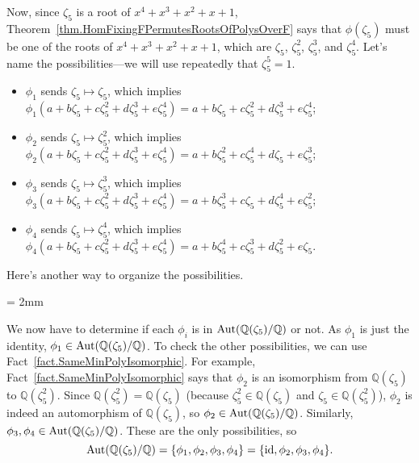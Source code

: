 \begin{example}
Now, since $\zeta_5$ is a root of $x^4+x^3+x^2+x+1$,  Theorem~\ref{thm.HomFixingFPermutesRootsOfPolysOverF} says that $\phi(\zeta_5)$ must be one of the roots of $x^4+x^3+x^2+x+1$, which are $\zeta_5$, $\zeta_5^2$, $\zeta_5^3$, and $\zeta_5^4$. Let's name the possibilities---we will use repeatedly that $\zeta_5^5 = 1$.
\begin{itemize}
\item $\phi_1$ sends $\zeta_5\mapsto \zeta_5$, which implies  $\phi_1(a+b\zeta_5+c\zeta_5^2+d\zeta_5^3+e\zeta_5^4) = a+b\zeta_5+c\zeta_5^2+d\zeta_5^3+e\zeta_5^4$;
\item $\phi_2$ sends $\zeta_5\mapsto \zeta_5^2$, which implies  $\phi_2(a+b\zeta_5+c\zeta_5^2+d\zeta_5^3+e\zeta_5^4) = a+b\zeta_5^2+c\zeta_5^4+d\zeta_5+e\zeta_5^3$;
\item $\phi_3$ sends $\zeta_5\mapsto \zeta_5^3$, which implies  $\phi_3(a+b\zeta_5+c\zeta_5^2+d\zeta_5^3+e\zeta_5^4) = a+b\zeta_5^3+c\zeta_5+d\zeta_5^4+e\zeta_5^2$;
\item $\phi_4$ sends $\zeta_5\mapsto \zeta_5^4$, which implies  $\phi_4(a+b\zeta_5+c\zeta_5^2+d\zeta_5^3+e\zeta_5^4) = a+b\zeta_5^4+c\zeta_5^3+d\zeta_5^2+e\zeta_5$.
\end{itemize}
Here's another way to organize the possibilities.
\begin{center}
\tabulinesep = 2mm
\end{center}
We now have to determine if each $\phi_i$ is in $\operatorname{Aut}(\mathbb{Q}(\zeta_5)/\mathbb{Q})$ or not. As $\phi_1$ is just the identity, $\phi_1 \in \operatorname{Aut}(\mathbb{Q}(\zeta_5)/\mathbb{Q})$. To check the other possibilities, we can use Fact~\ref{fact.SameMinPolyIsomorphic}. For example, Fact~\ref{fact.SameMinPolyIsomorphic} says that $\phi_2$ is an isomorphism from $\mathbb{Q}(\zeta_5)$ to $\mathbb{Q}(\zeta_5^2)$. Since $\mathbb{Q}(\zeta_5^2) =\mathbb{Q}(\zeta_5)$ (because $\zeta_5^2\in \mathbb{Q}(\zeta_5)$ and $\zeta_5\in \mathbb{Q}(\zeta_5^2)$), $\phi_2$ is indeed an automorphism of $\mathbb{Q}(\zeta_5)$, so $\phi_2 \in \operatorname{Aut}(\mathbb{Q}(\zeta_5)/\mathbb{Q})$. Similarly, $\phi_3,\phi_4 \in \operatorname{Aut}(\mathbb{Q}(\zeta_5)/\mathbb{Q})$. These are the only possibilities, so 
\[\operatorname{Aut}(\mathbb{Q}(\zeta_5)/\mathbb{Q}) = \{\phi_1,\phi_2,\phi_3,\phi_4\} = \{\text{id},\phi_2,\phi_3,\phi_4\}.\]
\end{example}

